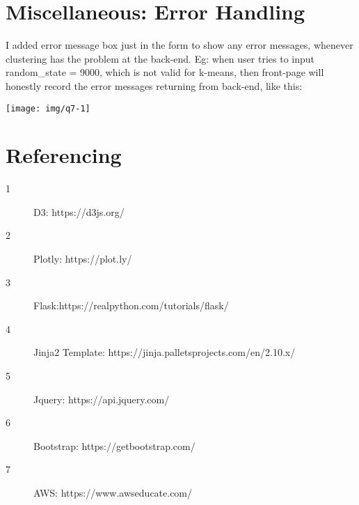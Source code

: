 \documentclass[]{report}
\begin{document}
\section{Miscellaneous: Error Handling}


I added error message box just in the form to show any error messages, whenever clustering has the problem at the back-end. Eg: when user tries to input random\_state = 9000, which is not valid for k-means, then front-page will honestly record the error messages returning from back-end, like this:

\texttt{[image: img/q7-1]}
\bigbreak


\section{Referencing}

\begin{description}
	\item[1] D3: https://d3js.org/
	\item[2] Plotly: https://plot.ly/
	\item[3] Flask:https://realpython.com/tutorials/flask/
	\item[4] Jinja2 Template: https://jinja.palletsprojects.com/en/2.10.x/
	\item[5] Jquery: https://api.jquery.com/
	\item[6] Bootstrap: https://getbootstrap.com/
	\item[7] AWS: https://www.awseducate.com/
\end{description}
\end{document}
